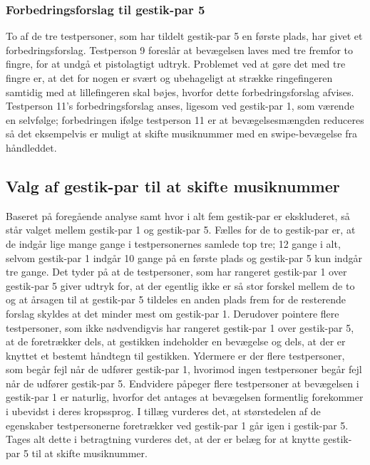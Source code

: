 \subsubsection{Forbedringsforslag til gestik-par 5}
\label{TestresultaterValgAfGestikkerForbedringGP5Skift}
%

To af de tre testpersoner, som har tildelt gestik-par 5 en første plads, har givet et forbedringsforslag. Testperson 9 foreslår at bevægelsen laves med tre fremfor to fingre, for at undgå et pistolagtigt udtryk. Problemet ved at gøre det med tre fingre er, at det for nogen er svært og ubehageligt at strække ringefingeren samtidig med at lillefingeren skal bøjes, hvorfor dette forbedringsforslag afvises. Testperson 11's forbedringsforslag anses, ligesom ved gestik-par 1, som værende en selvfølge; forbedringen ifølge testperson 11 er at bevægelsesmængden reduceres så det eksempelvis er muligt at skifte musiknummer med en swipe-bevægelse fra håndleddet.


%
\subsection{Valg af gestik-par til at skifte musiknummer}
\label{TestresultaterValgAfGestikkerValgSkift}
%
Baseret på foregående analyse samt  hvor i alt fem gestik-par er ekskluderet, så står valget mellem gestik-par 1 og gestik-par 5. Fælles for de to gestik-par er, at de indgår lige mange gange i testpersonernes samlede top tre; 12 gange i alt, selvom gestik-par 1 indgår 10 gange på en første plads og gestik-par 5 kun indgår tre gange. Det tyder på at de testpersoner, som har rangeret gestik-par 1 over gestik-par 5 giver udtryk for, at der egentlig ikke er så stor forskel mellem de to og at årsagen til at gestik-par 5 tildeles en anden plads frem for de resterende forslag skyldes at det minder mest om gestik-par 1. Derudover pointere flere testpersoner, som ikke nødvendigvis har rangeret gestik-par 1 over gestik-par 5, at de foretrækker dels, at gestikken indeholder en bevægelse og dels, at der er knyttet et bestemt håndtegn til gestikken. Ydermere er der flere testpersoner, som begår fejl når de udfører gestik-par 1, hvorimod ingen testpersoner begår fejl når de udfører gestik-par 5. Endvidere påpeger flere testpersoner at bevægelsen i gestik-par 1 er naturlig, hvorfor det antages at bevægelsen formentlig forekommer i ubevidst i deres kropssprog. I tillæg vurderes det, at størstedelen af de egenskaber testpersonerne foretrækker ved gestik-par 1 går igen i gestik-par 5. Tages alt dette i betragtning vurderes det, at der er belæg for at knytte gestik-par 5 til at skifte musiknummer.          

